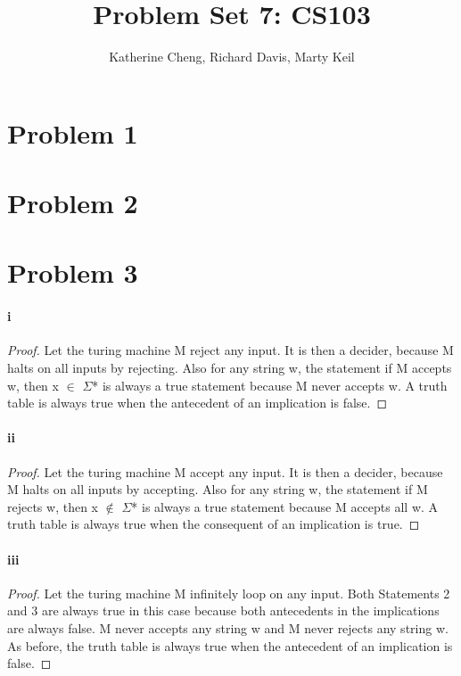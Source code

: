 \documentclass[10pt,letter]{article}
\begin{document}

\title{Problem Set 7: CS103}

\author{Katherine Cheng, Richard Davis, Marty Keil}

 
\maketitle

\section*{Problem 1}
\section*{Problem 2}
\section*{Problem 3}
\paragraph{i}
\begin{proof}
Let the turing machine M reject any input. It is then a decider, because M halts on all inputs by rejecting. Also for any string w, the statement if M accepts w, then x $\in$ $\Sigma$* is always a true statement because M never accepts w. A truth table is always true when the antecedent of an implication is false. 
\end{proof}
\paragraph{ii}
\begin{proof}
Let the turing machine M accept any input. It is then a decider, because M halts on all inputs by accepting. Also for any string w, the statement if M rejects w, then x $\notin$ $\Sigma$* is always a true statement because M accepts all w. A truth table is always true when the consequent of an implication is true. 
\end{proof}
\paragraph{iii}
\begin{proof}
Let the turing machine M infinitely loop on any input. Both Statements 2 and 3 are always true in this case because both antecedents in the implications are always false. M never accepts any string w and M never rejects any string w. As before, the truth table is always true when the antecedent of an implication is false. 
\end{proof}
\end{document}

